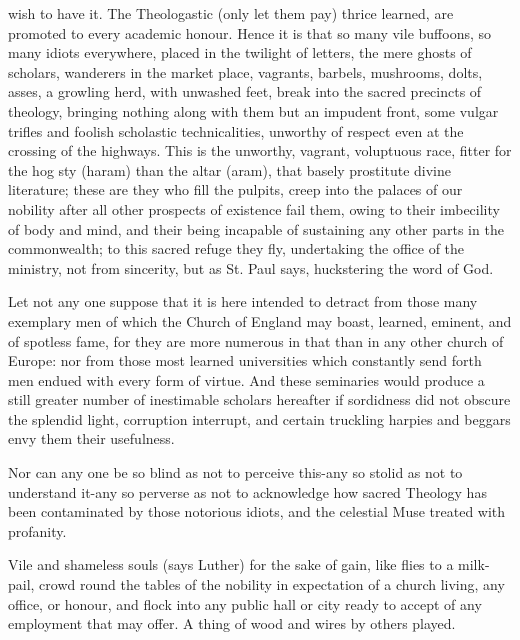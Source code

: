 wish to have it. The Theologastic (only let them pay) thrice learned, are
promoted to every academic honour. Hence it is that so many vile buffoons, so
many idiots everywhere, placed in the twilight of letters, the mere ghosts of
scholars, wanderers in the market place, vagrants, barbels, mushrooms, dolts,
asses, a growling herd, with unwashed feet, break into the sacred precincts of
theology, bringing nothing along with them but an impudent front, some vulgar
trifles and foolish scholastic technicalities, unworthy of respect even at the
crossing of the highways. This is the unworthy, vagrant, voluptuous race,
fitter for the hog sty (haram) than the altar (aram), that basely prostitute
divine literature; these are they who fill the pulpits, creep into the palaces
of our nobility after all other prospects of existence fail them, owing to
their imbecility of body and mind, and their being incapable of sustaining any
other parts in the commonwealth; to this sacred refuge they fly, undertaking
the office of the ministry, not from sincerity, but as St. Paul says,
huckstering the word of God.

Let not any one suppose that it is here intended to detract from those many
exemplary men of which the Church of England may boast, learned, eminent, and
of spotless fame, for they are more numerous in that than in any other church
of Europe: nor from those most learned universities which constantly send forth
men endued with every form of virtue. And these seminaries would produce a
still greater number of inestimable scholars hereafter if sordidness did not
obscure the splendid light, corruption interrupt, and certain truckling harpies
and beggars envy them their usefulness.

Nor can any one be so blind as not to perceive this-any so stolid as not to
understand it-any so perverse as not to acknowledge how sacred Theology has
been contaminated by those notorious idiots, and the celestial Muse treated
with profanity.

Vile and shameless souls (says Luther) for the sake of gain, like flies to a
milk-pail, crowd round the tables of the nobility in expectation of a church
living, any office, or honour, and flock into any public hall or city ready to
accept of any employment that may offer. A thing of wood and wires by others
played.

